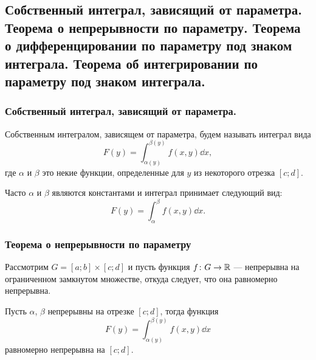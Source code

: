 \subsection{Собственный интеграл, зависящий от параметра. Теорема о непрерывности по параметру. Теорема о дифференцировании по параметру под знаком интеграла. Теорема об интегрировании по параметру под знаком интеграла.}

\subsubsection{Собственный интеграл, зависящий от параметра.}

\begin{definition*}
    Собственным интегралом, зависящем от параметра, будем называть интеграл вида
    \begin{equation*}
        F(y) = \int_{\alpha(y)}^{\beta(y)} f(x, y) \dd x,
    \end{equation*}
    где $\alpha$ и $\beta$ это некие функции, определенные для $y$ из некоторого отрезка $[c; d]$. 

    Часто $\alpha$ и $\beta$ являются константами и интеграл принимает следующий вид:
    \begin{equation*}
        F(y) = \int_{\alpha}^{\beta} f(x, y) \dd x.
    \end{equation*}
\end{definition*}

\subsubsection{Теорема о непрерывности по параметру}

\begin{theorem*}
    Рассмотрим $G = [a; b] \times [c; d]$ и пусть функция $f\colon G \to \mathbb{R}$ --- непрерывна на ограниченном замкнутом множестве, откуда следует, что она равномерно непрерывна.

    Пусть $\alpha$, $\beta$ непрерывны на отрезке $[c; d]$, тогда функция
    \begin{equation*}
        F(y) = \int_{\alpha(y)}^{\beta(y)} f(x, y) \dd x
    \end{equation*}
    равномерно непрерывна на $[c; d]$.
\end{theorem*}


